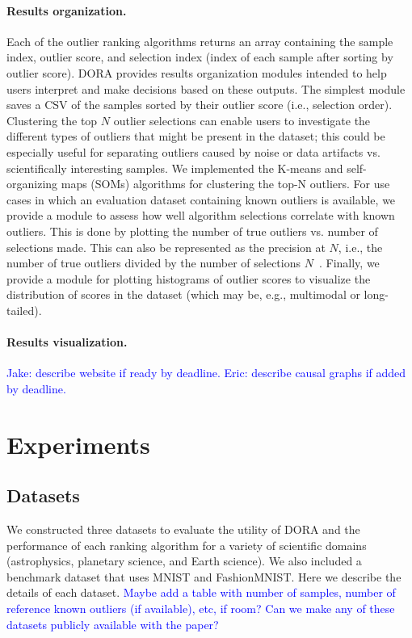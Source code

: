 \documentclass[letterpaper]{article} %
\newcommand{\todo}[1]{\textcolor{blue}{#1}}
\begin{document}
\paragraph{Results organization.} 
Each of the outlier ranking algorithms returns an array containing the sample
index, outlier score, and selection index (index of each sample after sorting
by outlier score). DORA provides results organization modules intended to help
 users interpret and make decisions based on these outputs. The simplest 
 module saves a CSV of the samples sorted by their outlier score 
 (i.e., selection order). Clustering the top
  $N$ outlier selections can enable users to investigate the different types of 
 outliers that might be present in the dataset; this could be especially useful
 for separating outliers caused by noise or data artifacts vs. scientifically 
 interesting samples. We implemented the K-means and self-organizing maps 
 (SOMs) algorithms for clustering the top-N outliers. For use cases in which an
 evaluation dataset containing known outliers is available, we provide a module
 to assess how well algorithm selections correlate with known outliers. This is
 done by plotting the number of true outliers vs. number of selections made. 
 This can also be represented as the precision at $N$, i.e., 
 the number of true outliers divided by the number of selections $N$~\citep{campos2016evaluation}. Finally,
 we provide a module for plotting histograms of outlier scores to visualize the
 distribution of scores in the dataset (which may be, e.g., multimodal or 
 long-tailed).

\paragraph{Results visualization.} 
\todo{Jake: describe website if ready by deadline.}
\todo{Eric: describe causal graphs if added by deadline.}

\section{Experiments}

\subsection{Datasets}
We constructed three datasets to evaluate the utility of DORA and the
performance of each ranking algorithm for a variety of scientific domains
 (astrophysics, planetary science, and Earth science). We also included a 
 benchmark dataset that uses MNIST and FashionMNIST. Here we describe
 the details of each dataset.
\todo{Maybe add
 a table with number of samples, number of reference known outliers (if 
 available), etc, if room? }
 \todo{Can we make any of these datasets publicly available with the paper?}
\end{document}
